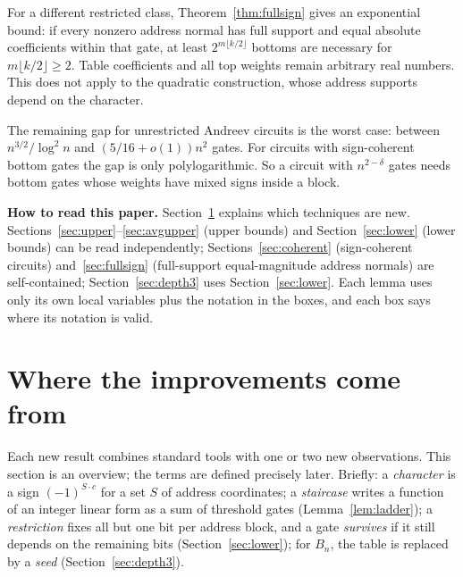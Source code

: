 \documentclass[11pt,letterpaper]{article}
\theoremstyle{remark}
\newcommand{\sect}[1]{\section{\texorpdfstring{\color{ink}#1}{#1}}}
\newcommand{\smalltitle}[1]{\textbf{\color{ink}#1}\quad}
\begin{document}
For a different restricted class, Theorem~\ref{thm:fullsign} gives an
exponential bound: if every nonzero address normal has full support and
equal absolute coefficients within that gate, at least
$2^{m\lfloor k/2\rfloor}$ bottoms are necessary for $m\lfloor k/2\rfloor\ge2$.
Table coefficients and all top weights remain arbitrary real numbers.
This does not apply to the quadratic construction, whose address supports
depend on the character.

The remaining gap for unrestricted Andreev circuits is the worst case: between
$n^{3/2}/\log^2n$ and $(5/16+o(1))n^2$ gates. For circuits with sign-coherent
bottom gates the gap is only polylogarithmic. So a circuit with $n^{2-\delta}$
gates needs bottom gates whose weights have mixed signs inside a block.

\smalltitle{How to read this paper.}
Section~\ref{sec:tech} explains which techniques are new.
Sections~\ref{sec:upper}--\ref{sec:avgupper} (upper bounds) and
Section~\ref{sec:lower} (lower bounds) can be read independently;
Sections~\ref{sec:coherent} (sign-coherent circuits) and~\ref{sec:fullsign}
(full-support equal-magnitude address normals) are self-contained;
Section~\ref{sec:depth3} uses Section~\ref{sec:lower}. Each lemma uses only
its own local variables plus the notation in the boxes, and each box says
where its notation is valid.

\sect{Where the improvements come from}\label{sec:tech}

Each new result combines standard tools with one or two new observations.
This section is an overview; the terms are defined precisely later. Briefly:
a \emph{character} is a sign $(-1)^{S\cdot c}$ for a set $S$ of address
coordinates; a \emph{staircase} writes a function of an integer linear form as
a sum of threshold gates (Lemma~\ref{lem:ladder}); a \emph{restriction} fixes
all but one bit per address block, and a gate \emph{survives} if it still
depends on the remaining bits (Section~\ref{sec:lower}); for $B_n$, the
table is replaced by a \emph{seed} (Section~\ref{sec:depth3}).
\end{document}
